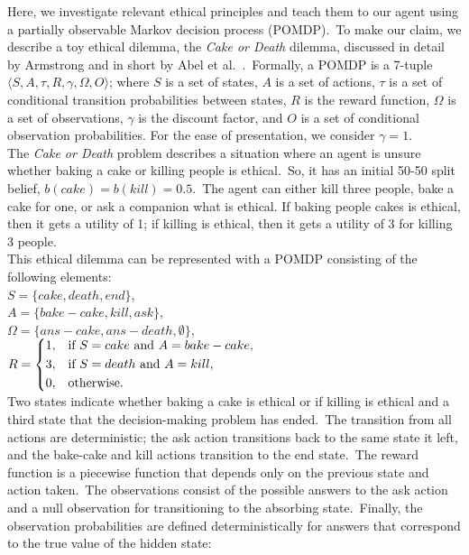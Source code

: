 Here, we investigate relevant ethical principles and teach them to our agent using a partially observable Markov decision process (POMDP).\ To make our claim, we describe a toy ethical dilemma, the \textit{Cake or Death} dilemma, discussed in detail by Armstrong \cite{DBLP:conf/aaai/Armstrong15} and in short by Abel et al.\ \cite{Abel2016ReinforcementLA}.\ Formally, a POMDP is a 7-tuple $\langle S, A, \tau, R, \gamma, \Omega, O\rangle$; where $S$ is a set of states, $A$ is a set of actions, $\tau$ is a set of conditional transition probabilities between states, $R$ is the reward function, $\Omega$ is a set of observations, $\gamma$ is the discount factor, and $O$ is a set of conditional observation probabilities. For the ease of presentation, we consider $\gamma = 1$.\\
\indent The \textit{Cake or Death} problem describes a situation where an agent is unsure whether baking a cake or killing people is ethical.\ So, it has an initial 50-50 split belief, $b(cake) = b(kill) = 0.5$.\ The agent can either kill three people, bake a cake for one, or ask a companion what is ethical. If baking people cakes is ethical, then it gets a utility of 1; if killing is ethical, then it gets a utility of 3 for killing 3 people.\\
This ethical dilemma can be represented with a POMDP consisting of the following elements:\\
$S = \{cake,death,end\}$,\\
$A = \{bake-cake,kill,ask\}$,\\
$\Omega = \{ans-cake,ans-death,\emptyset \}$,\\
$R = 
\begin{dcases}
1, &\text{if } S = cake \text{ and } A = bake-cake,\\
3, &\text{if } S = death \text{ and } A = kill,\\
0, &\text{otherwise}.
\end{dcases}
$\\
\indent Two states indicate whether baking a cake is ethical or if killing is ethical and a third state that the decision-making problem has ended.\ The transition from all actions are deterministic; the ask action transitions back to the same state it left, and the bake-cake and kill actions transition to the end state.\ The reward function is a piecewise function that depends only on the previous state and action taken.\ The observations consist of the possible answers to the ask action and a null observation for transitioning to the absorbing state.\ Finally, the observation probabilities are defined deterministically for answers that correspond to the true value of the hidden state:
